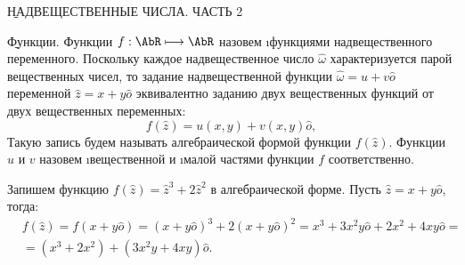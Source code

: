 \begin{center}
	\b{НАДВЕЩЕСТВЕННЫЕ ЧИСЛА. ЧАСТЬ 2}
\end{center}

\b{Функции.} Функции $f: \AbR \longmapsto \AbR$ назовем \i{функциями надвещественного переменного}. Поскольку каждое надвещественное число $\hat{\omega}$ характеризуется парой вещественных чисел, то задание надвещественной функции $\hat{\omega}=u+v\hat{o}$ переменной $\hat{z}=x+y\hat{o}$ эквивалентно заданию двух вещественных функций от двух вещественных переменных:
\begin{equation}
	f(\hat{z})=u(x, y)+v(x, y)\hat{o},
\end{equation}
Такую запись будем называть алгебраической формой функции $f(\hat{z})$. Функции $u$ и $v$ назовем \i{вещественной} и \i{малой} частями функции $f$ соответственно.
\begin{example}
	Запишем функцию $f(\hat{z})=\hat{z}^3+2\hat{z}^2$ в алгебраической форме. Пусть $\hat{z}=x+y\hat{o}$, тогда:
	\begin{eqnarray*}
		&f(\hat{z})=f(x+y\hat{o})=(x+y\hat{o})^3+2(x+y\hat{o})^2=x^3+3x^2y\hat{o}+2x^2+4xy\hat{o}=      \\ &=(x^3+2x^2)+(3x^2y+4xy)\hat{o}.
	\end{eqnarray*}
\end{example}

